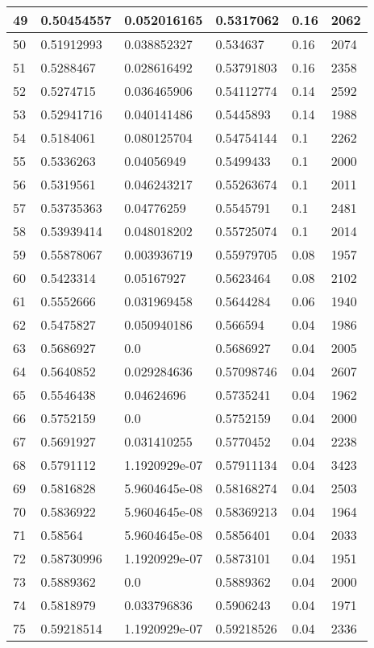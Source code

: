 \begin{longtable}{|l|l|l|l|l|l|}
49 & 0.50454557 & 0.052016165 & 0.5317062 & 0.16 & 2062 \\ \hline 
50 & 0.51912993 & 0.038852327 & 0.534637 & 0.16 & 2074 \\ \hline 
51 & 0.5288467 & 0.028616492 & 0.53791803 & 0.16 & 2358 \\ \hline 
52 & 0.5274715 & 0.036465906 & 0.54112774 & 0.14 & 2592 \\ \hline 
53 & 0.52941716 & 0.040141486 & 0.5445893 & 0.14 & 1988 \\ \hline 
54 & 0.5184061 & 0.080125704 & 0.54754144 & 0.1 & 2262 \\ \hline 
55 & 0.5336263 & 0.04056949 & 0.5499433 & 0.1 & 2000 \\ \hline 
56 & 0.5319561 & 0.046243217 & 0.55263674 & 0.1 & 2011 \\ \hline 
57 & 0.53735363 & 0.04776259 & 0.5545791 & 0.1 & 2481 \\ \hline 
58 & 0.53939414 & 0.048018202 & 0.55725074 & 0.1 & 2014 \\ \hline 
59 & 0.55878067 & 0.003936719 & 0.55979705 & 0.08 & 1957 \\ \hline 
60 & 0.5423314 & 0.05167927 & 0.5623464 & 0.08 & 2102 \\ \hline 
61 & 0.5552666 & 0.031969458 & 0.5644284 & 0.06 & 1940 \\ \hline 
62 & 0.5475827 & 0.050940186 & 0.566594 & 0.04 & 1986 \\ \hline 
63 & 0.5686927 & 0.0 & 0.5686927 & 0.04 & 2005 \\ \hline 
64 & 0.5640852 & 0.029284636 & 0.57098746 & 0.04 & 2607 \\ \hline 
65 & 0.5546438 & 0.04624696 & 0.5735241 & 0.04 & 1962 \\ \hline 
66 & 0.5752159 & 0.0 & 0.5752159 & 0.04 & 2000 \\ \hline 
67 & 0.5691927 & 0.031410255 & 0.5770452 & 0.04 & 2238 \\ \hline 
68 & 0.5791112 & 1.1920929e-07 & 0.57911134 & 0.04 & 3423 \\ \hline 
69 & 0.5816828 & 5.9604645e-08 & 0.58168274 & 0.04 & 2503 \\ \hline 
70 & 0.5836922 & 5.9604645e-08 & 0.58369213 & 0.04 & 1964 \\ \hline 
71 & 0.58564 & 5.9604645e-08 & 0.5856401 & 0.04 & 2033 \\ \hline 
72 & 0.58730996 & 1.1920929e-07 & 0.5873101 & 0.04 & 1951 \\ \hline 
73 & 0.5889362 & 0.0 & 0.5889362 & 0.04 & 2000 \\ \hline 
74 & 0.5818979 & 0.033796836 & 0.5906243 & 0.04 & 1971 \\ \hline 
75 & 0.59218514 & 1.1920929e-07 & 0.59218526 & 0.04 & 2336 \\ \hline 
\end{longtable}